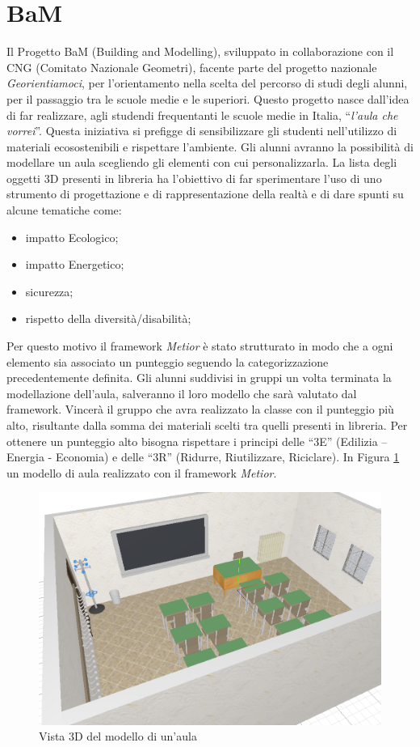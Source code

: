 \section{BaM}
\label{sec:chapter_4_section_1}
Il Progetto BaM (Building and Modelling), sviluppato in collaborazione con il CNG (Comitato Nazionale Geometri),
facente parte del progetto nazionale \emph{Georientiamoci}, per l’orientamento nella scelta
del percorso di studi degli alunni, per il passaggio tra le scuole medie e le superiori.
Questo progetto nasce dall'idea di far realizzare, agli studendi frequentanti le scuole medie in Italia,
``\emph{l'aula che vorrei}''. Questa iniziativa si prefigge di sensibilizzare gli studenti nell’utilizzo di materiali
ecosostenibili e rispettare l’ambiente.
Gli alunni avranno la possibilità di modellare un aula scegliendo gli elementi con cui personalizzarla.
La lista degli oggetti 3D presenti in libreria ha l’obiettivo di far sperimentare l’uso di uno strumento di progettazione
e di rappresentazione della realtà e di dare spunti su alcune tematiche come:
\begin{itemize}
\item impatto Ecologico;
\item impatto Energetico;
\item sicurezza;
\item rispetto della diversità/disabilità;
\end{itemize}
Per questo motivo il framework \emph{Metior} è stato strutturato in modo che a ogni elemento sia associato un punteggio seguendo
la categorizzazione precedentemente definita.
Gli alunni suddivisi in gruppi un volta terminata la modellazione dell'aula, salveranno il loro modello che sarà valutato
dal framework.
Vincerà il gruppo che avra realizzato la classe con il punteggio più alto, risultante dalla somma dei materiali scelti
tra quelli presenti in libreria. Per ottenere un punteggio alto bisogna rispettare i principi delle
“3E” (Edilizia – Energia - Economia) e delle “3R” (Ridurre, Riutilizzare, Riciclare). In Figura \ref{fig:3daula}
un modello di aula realizzato con il framework \emph{Metior}.\\
\begin{figure}[htbp] %
   \centering
   \includegraphics[width=0.6\linewidth]{images/3d-school-2}
   \caption{Vista 3D del modello di un'aula}
   \label{fig:3daula}
   \end{figure}
\newpage

